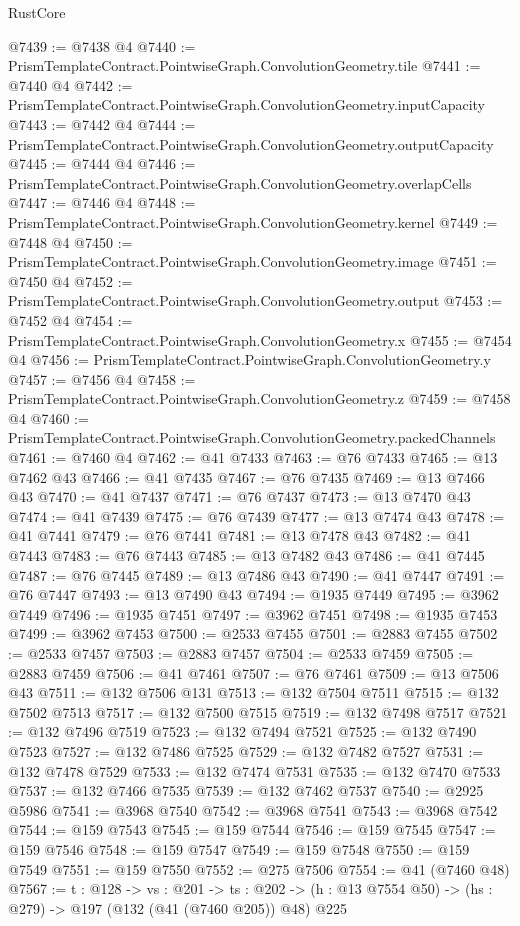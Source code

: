\begin{lexlean}{RustCore}
\begin{coremodule}
@7439 := @7438 @4
@7440 := PrismTemplateContract.PointwiseGraph.ConvolutionGeometry.tile
@7441 := @7440 @4
@7442 := PrismTemplateContract.PointwiseGraph.ConvolutionGeometry.inputCapacity
@7443 := @7442 @4
@7444 := PrismTemplateContract.PointwiseGraph.ConvolutionGeometry.outputCapacity
@7445 := @7444 @4
@7446 := PrismTemplateContract.PointwiseGraph.ConvolutionGeometry.overlapCells
@7447 := @7446 @4
@7448 := PrismTemplateContract.PointwiseGraph.ConvolutionGeometry.kernel
@7449 := @7448 @4
@7450 := PrismTemplateContract.PointwiseGraph.ConvolutionGeometry.image
@7451 := @7450 @4
@7452 := PrismTemplateContract.PointwiseGraph.ConvolutionGeometry.output
@7453 := @7452 @4
@7454 := PrismTemplateContract.PointwiseGraph.ConvolutionGeometry.x
@7455 := @7454 @4
@7456 := PrismTemplateContract.PointwiseGraph.ConvolutionGeometry.y
@7457 := @7456 @4
@7458 := PrismTemplateContract.PointwiseGraph.ConvolutionGeometry.z
@7459 := @7458 @4
@7460 := PrismTemplateContract.PointwiseGraph.ConvolutionGeometry.packedChannels
@7461 := @7460 @4
@7462 := @41 @7433
@7463 := @76 @7433
@7465 := @13 @7462 @43
@7466 := @41 @7435
@7467 := @76 @7435
@7469 := @13 @7466 @43
@7470 := @41 @7437
@7471 := @76 @7437
@7473 := @13 @7470 @43
@7474 := @41 @7439
@7475 := @76 @7439
@7477 := @13 @7474 @43
@7478 := @41 @7441
@7479 := @76 @7441
@7481 := @13 @7478 @43
@7482 := @41 @7443
@7483 := @76 @7443
@7485 := @13 @7482 @43
@7486 := @41 @7445
@7487 := @76 @7445
@7489 := @13 @7486 @43
@7490 := @41 @7447
@7491 := @76 @7447
@7493 := @13 @7490 @43
@7494 := @1935 @7449
@7495 := @3962 @7449
@7496 := @1935 @7451
@7497 := @3962 @7451
@7498 := @1935 @7453
@7499 := @3962 @7453
@7500 := @2533 @7455
@7501 := @2883 @7455
@7502 := @2533 @7457
@7503 := @2883 @7457
@7504 := @2533 @7459
@7505 := @2883 @7459
@7506 := @41 @7461
@7507 := @76 @7461
@7509 := @13 @7506 @43
@7511 := @132 @7506 @131
@7513 := @132 @7504 @7511
@7515 := @132 @7502 @7513
@7517 := @132 @7500 @7515
@7519 := @132 @7498 @7517
@7521 := @132 @7496 @7519
@7523 := @132 @7494 @7521
@7525 := @132 @7490 @7523
@7527 := @132 @7486 @7525
@7529 := @132 @7482 @7527
@7531 := @132 @7478 @7529
@7533 := @132 @7474 @7531
@7535 := @132 @7470 @7533
@7537 := @132 @7466 @7535
@7539 := @132 @7462 @7537
@7540 := @2925 @5986
@7541 := @3968 @7540
@7542 := @3968 @7541
@7543 := @3968 @7542
@7544 := @159 @7543
@7545 := @159 @7544
@7546 := @159 @7545
@7547 := @159 @7546
@7548 := @159 @7547
@7549 := @159 @7548
@7550 := @159 @7549
@7551 := @159 @7550
@7552 := @275 @7506
@7554 := @41 (@7460 @48)
@7567 := {t : @128} ->
  {vs : @201} ->
  {ts : @202} -> (h : @13 @7554 @50) -> (hs : @279) -> @197 (@132 (@41 (@7460 @205)) @48) @225

\end{coremodule}
\end{lexlean}
